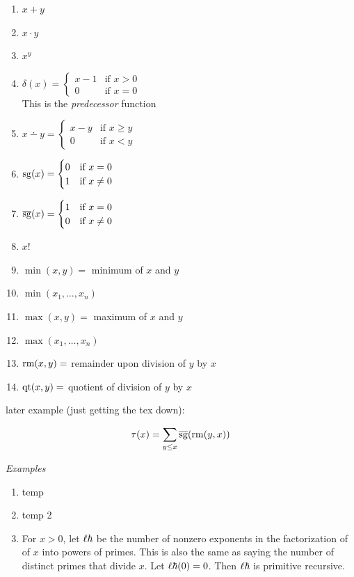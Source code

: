 \begin{enumerate} [label=\alph*.]
    \item $x + y$
    \item $x \cdot y$
    \item $x^y$
    \item $\delta(x) = \begin{cases}
        x-1 & \text{if } x>0 \\
        0 & \text{if } x=0
    \end{cases}$ \\
    This is the \textit{predecessor} function
    \item $x \dotminus y =\begin{cases}
        x-y & \text{if } x\geq y \\
        0 & \text{if } x < y
    \end{cases}$
    \item $\operatorname{sg}(x) =\begin{cases}
        0 & \text{if } x=0 \\
        1 & \text{if } x \not =0
    \end{cases}$
    \item $\operatorname{\overline{\operatorname{sg}}}(x) = \begin{cases}
        1 & \text{if } x=0 \\
        0 & \text{if } x \not = 0
    \end{cases}$
    \item $x!$
    \item $\min (x,y)=$ minimum of $x$ and $y$
    \item $\min(x_1, \dots, x_n)$
    \item $\max(x, y)=$ maximum of $x$ and $y$
    \item $\max(x_1, \dots, x_n)$
    \item $\operatorname{rm}(x,y)=$ remainder upon division of $y$ by $x$
    \item $\operatorname{qt}(x, y)=$ quotient of division of $y$ by $x$
\end{enumerate}


later example (just getting the tex down):

\[\tau(x)=\sum_{y\leq x} \operatorname{\overline{\operatorname{sg}}}(\operatorname{rm} (y, x))\]


\textit{Examples}
\begin{enumerate} [label=\arabic*.]
    \item temp
    \item temp 2
    \item For $x>0$, let $\ell\hbar$ be the number of nonzero exponents in the factorization of of $x$ into powers of primes. This is also the same as saying the number of distinct primes that divide $x$. Let $\ell\hbar(0)=0$. Then $\ell\hbar$ is primitive recursive.
\end{enumerate}


